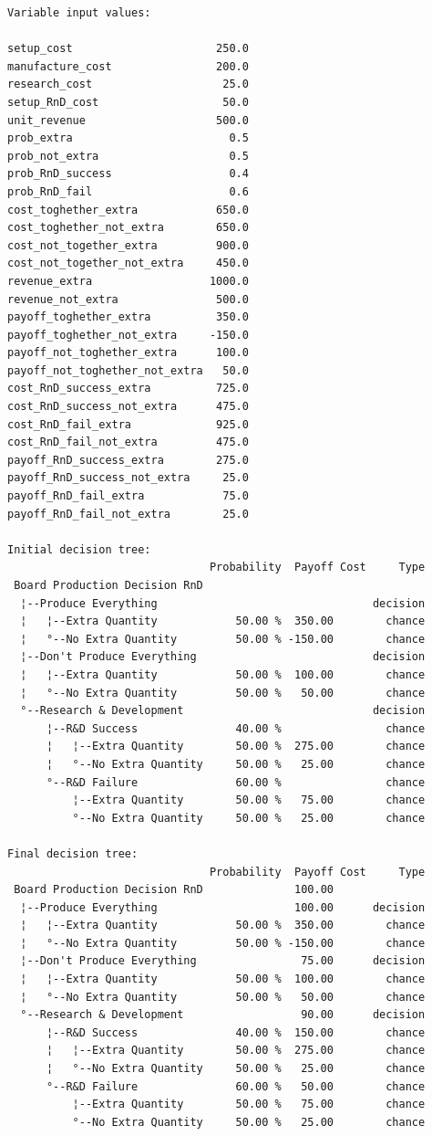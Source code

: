 \documentclass[]{article}
\begin{document}
\begin{verbatim}
Variable input values:
                                     
setup_cost                      250.0
manufacture_cost                200.0
research_cost                    25.0
setup_RnD_cost                   50.0
unit_revenue                    500.0
prob_extra                        0.5
prob_not_extra                    0.5
prob_RnD_success                  0.4
prob_RnD_fail                     0.6
cost_toghether_extra            650.0
cost_toghether_not_extra        650.0
cost_not_together_extra         900.0
cost_not_together_not_extra     450.0
revenue_extra                  1000.0
revenue_not_extra               500.0
payoff_toghether_extra          350.0
payoff_toghether_not_extra     -150.0
payoff_not_toghether_extra      100.0
payoff_not_toghether_not_extra   50.0
cost_RnD_success_extra          725.0
cost_RnD_success_not_extra      475.0
cost_RnD_fail_extra             925.0
cost_RnD_fail_not_extra         475.0
payoff_RnD_success_extra        275.0
payoff_RnD_success_not_extra     25.0
payoff_RnD_fail_extra            75.0
payoff_RnD_fail_not_extra        25.0

Initial decision tree:
                               Probability  Payoff Cost     Type
 Board Production Decision RnD                                  
  ¦--Produce Everything                                 decision
  ¦   ¦--Extra Quantity            50.00 %  350.00        chance
  ¦   °--No Extra Quantity         50.00 % -150.00        chance
  ¦--Don't Produce Everything                           decision
  ¦   ¦--Extra Quantity            50.00 %  100.00        chance
  ¦   °--No Extra Quantity         50.00 %   50.00        chance
  °--Research & Development                             decision
      ¦--R&D Success               40.00 %                chance
      ¦   ¦--Extra Quantity        50.00 %  275.00        chance
      ¦   °--No Extra Quantity     50.00 %   25.00        chance
      °--R&D Failure               60.00 %                chance
          ¦--Extra Quantity        50.00 %   75.00        chance
          °--No Extra Quantity     50.00 %   25.00        chance

Final decision tree:
                               Probability  Payoff Cost     Type
 Board Production Decision RnD              100.00              
  ¦--Produce Everything                     100.00      decision
  ¦   ¦--Extra Quantity            50.00 %  350.00        chance
  ¦   °--No Extra Quantity         50.00 % -150.00        chance
  ¦--Don't Produce Everything                75.00      decision
  ¦   ¦--Extra Quantity            50.00 %  100.00        chance
  ¦   °--No Extra Quantity         50.00 %   50.00        chance
  °--Research & Development                  90.00      decision
      ¦--R&D Success               40.00 %  150.00        chance
      ¦   ¦--Extra Quantity        50.00 %  275.00        chance
      ¦   °--No Extra Quantity     50.00 %   25.00        chance
      °--R&D Failure               60.00 %   50.00        chance
          ¦--Extra Quantity        50.00 %   75.00        chance
          °--No Extra Quantity     50.00 %   25.00        chance
\end{verbatim}
\end{document}
